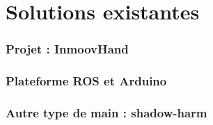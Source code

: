 
\part*{Solutions existantes}

\section{Projet : InmoovHand}

\section{Plateforme ROS et Arduino}

\section{Autre type de main : shadow-harm}

